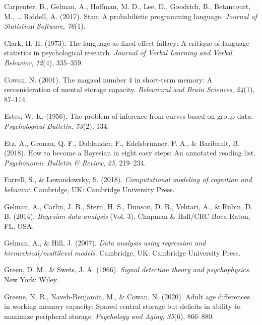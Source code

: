 \documentclass[
  english,
  ,man,floatsintext]{apa6}
\begin{document}
\leavevmode\hypertarget{ref-carpenter2017stan}{}%
Carpenter, B., Gelman, A., Hoffman, M. D., Lee, D., Goodrich, B., Betancourt, M., \ldots{} Riddell, A. (2017). Stan: A probabilistic programming language. \emph{Journal of Statistical Software}, \emph{76}(1).

\leavevmode\hypertarget{ref-clark1973language}{}%
Clark, H. H. (1973). The language-as-fixed-effect fallacy: A critique of language statistics in psychological research. \emph{Journal of Verbal Learning and Verbal Behavior}, \emph{12}(4), 335--359.

\leavevmode\hypertarget{ref-Cowan2001}{}%
Cowan, N. (2001). The magical number 4 in short-term memory: A recosnideration of mental storage capacity. \emph{Behavioral and Brain Sciences}, \emph{24}(1), 87--114.

\leavevmode\hypertarget{ref-estes1956problem}{}%
Estes, W. K. (1956). The problem of inference from curves based on group data. \emph{Psychological Bulletin}, \emph{53}(2), 134.

\leavevmode\hypertarget{ref-EtzEtAl2018}{}%
Etz, A., Gronau, Q. F., Dablander, F., Edelsbrunner, P. A., \& Baribault, B. (2018). How to become a Bayesian in eight easy steps: An annotated reading list. \emph{Psychonomic Bulletin \& Review}, \emph{25}, 219--234.

\leavevmode\hypertarget{ref-FarrellAndLewandowsky2018}{}%
Farrell, S., \& Lewandowsky, S. (2018). \emph{Computational modeling of cognition and behavior}. Cambridge, UK: Cambridge University Press.

\leavevmode\hypertarget{ref-GelmanEtAl2014}{}%
Gelman, A., Carlin, J. B., Stern, H. S., Dunson, D. B., Vehtari, A., \& Rubin, D. B. (2014). \emph{Bayesian data analysis} (Vol. 3). Chapman \& Hall/CRC Boca Raton, FL, USA.

\leavevmode\hypertarget{ref-GelmanAndHill2007}{}%
Gelman, A., \& Hill, J. (2007). \emph{Data analysis using regression and hierarchical/multilevel models}. Cambridge, UK: Cambridge University Press.

\leavevmode\hypertarget{ref-GreenAndSwets1966}{}%
Green, D. M., \& Swets, J. A. (1966). \emph{Signal detection theory and psychophysics}. New York: Wiley.

\leavevmode\hypertarget{ref-GreeneEtAl2020}{}%
Greene, N. R., Naveh-Benjamin, M., \& Cowan, N. (2020). Adult age differences in working memory capacity: Spared central storage but deficits in ability to maximize peripheral storage. \emph{Psychology and Aging}, \emph{35}(6), 866--880.
\end{document}
